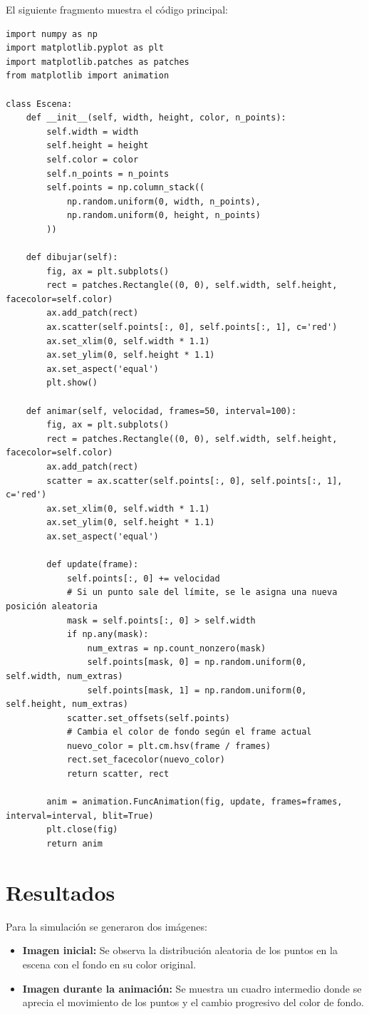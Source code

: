 \documentclass[a4paper,10pt]{article}
\begin{document}
El siguiente fragmento muestra el código principal:

\begin{lstlisting}[caption={Código en Python para la simulación}, label=lst:codigo]
import numpy as np
import matplotlib.pyplot as plt
import matplotlib.patches as patches
from matplotlib import animation

class Escena:
    def __init__(self, width, height, color, n_points):
        self.width = width
        self.height = height
        self.color = color
        self.n_points = n_points
        self.points = np.column_stack((
            np.random.uniform(0, width, n_points),
            np.random.uniform(0, height, n_points)
        ))
    
    def dibujar(self):
        fig, ax = plt.subplots()
        rect = patches.Rectangle((0, 0), self.width, self.height, facecolor=self.color)
        ax.add_patch(rect)
        ax.scatter(self.points[:, 0], self.points[:, 1], c='red')
        ax.set_xlim(0, self.width * 1.1)
        ax.set_ylim(0, self.height * 1.1)
        ax.set_aspect('equal')
        plt.show()

    def animar(self, velocidad, frames=50, interval=100):
        fig, ax = plt.subplots()
        rect = patches.Rectangle((0, 0), self.width, self.height, facecolor=self.color)
        ax.add_patch(rect)
        scatter = ax.scatter(self.points[:, 0], self.points[:, 1], c='red')
        ax.set_xlim(0, self.width * 1.1)
        ax.set_ylim(0, self.height * 1.1)
        ax.set_aspect('equal')

        def update(frame):
            self.points[:, 0] += velocidad
            # Si un punto sale del límite, se le asigna una nueva posición aleatoria
            mask = self.points[:, 0] > self.width
            if np.any(mask):
                num_extras = np.count_nonzero(mask)
                self.points[mask, 0] = np.random.uniform(0, self.width, num_extras)
                self.points[mask, 1] = np.random.uniform(0, self.height, num_extras)
            scatter.set_offsets(self.points)
            # Cambia el color de fondo según el frame actual
            nuevo_color = plt.cm.hsv(frame / frames)
            rect.set_facecolor(nuevo_color)
            return scatter, rect

        anim = animation.FuncAnimation(fig, update, frames=frames, interval=interval, blit=True)
        plt.close(fig)
        return anim
\end{lstlisting}

\section{Resultados}
Para la simulación se generaron dos imágenes:
\begin{itemize}
    \item \textbf{Imagen inicial:} Se observa la distribución aleatoria de los puntos en la escena con el fondo en su color original.
    \item \textbf{Imagen durante la animación:} Se muestra un cuadro intermedio donde se aprecia el movimiento de los puntos y el cambio progresivo del color de fondo.
\end{itemize}
\end{document}
